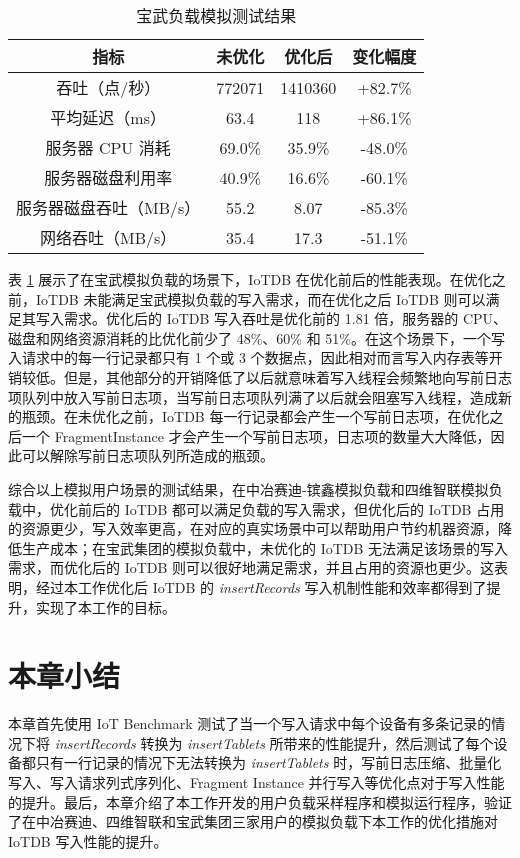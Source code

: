 \begin{table}
  \centering
  \caption{宝武负载模拟测试结果}
  \begin{tabular}{cccc}
    \toprule 
    指标 &  未优化  & 优化后 & 变化幅度 \\
    \midrule
    吞吐（点/秒） & 772071 & 1410360 & +82.7\%\\  
    平均延迟（ms） & 63.4 & 118 & +86.1\%\\  
    服务器 CPU 消耗 & 69.0\% & 35.9\% & -48.0\%\\  
    服务器磁盘利用率 & 40.9\% & 16.6\% & -60.1\%\\  
    服务器磁盘吞吐（MB/s） & 55.2 & 8.07 & -85.3\% \\  
    网络吞吐（MB/s） & 35.4 & 17.3 & -51.1\%\\ 
    \bottomrule
  \end{tabular}
  \label{tabular:bw-performance}
\end{table}
表 \ref{tabular:bw-performance} 展示了在宝武模拟负载的场景下，IoTDB 在优化前后的性能表现。在优化之前，IoTDB 未能满足宝武模拟负载的写入需求，而在优化之后 IoTDB 则可以满足其写入需求。优化后的 IoTDB 写入吞吐是优化前的 1.81 倍，服务器的 CPU、磁盘和网络资源消耗的比优化前少了 48\%、60\% 和 51\%。在这个场景下，一个写入请求中的每一行记录都只有 1 个或 3 个数据点，因此相对而言写入内存表等开销较低。但是，其他部分的开销降低了以后就意味着写入线程会频繁地向写前日志项队列中放入写前日志项，当写前日志项队列满了以后就会阻塞写入线程，造成新的瓶颈。在未优化之前，IoTDB 每一行记录都会产生一个写前日志项，在优化之后一个 FragmentInstance 才会产生一个写前日志项，日志项的数量大大降低，因此可以解除写前日志项队列所造成的瓶颈。

综合以上模拟用户场景的测试结果，在中冶赛迪-镔鑫模拟负载和四维智联模拟负载中，优化前后的 IoTDB 都可以满足负载的写入需求，但优化后的 IoTDB 占用的资源更少，写入效率更高，在对应的真实场景中可以帮助用户节约机器资源，降低生产成本；在宝武集团的模拟负载中，未优化的 IoTDB 无法满足该场景的写入需求，而优化后的 IoTDB 则可以很好地满足需求，并且占用的资源也更少。这表明，经过本工作优化后 IoTDB 的 \emph{insertRecords} 写入机制性能和效率都得到了提升，实现了本工作的目标。
\section{本章小结}
本章首先使用 IoT Benchmark 测试了当一个写入请求中每个设备有多条记录的情况下将 \emph{insertRecords} 转换为 \emph{insertTablets} 所带来的性能提升，然后测试了每个设备都只有一行记录的情况下无法转换为 \emph{insertTablets} 时，写前日志压缩、批量化写入、写入请求列式序列化、Fragment Instance 并行写入等优化点对于写入性能的提升。最后，本章介绍了本工作开发的用户负载采样程序和模拟运行程序，验证了在中冶赛迪、四维智联和宝武集团三家用户的模拟负载下本工作的优化措施对 IoTDB 写入性能的提升。